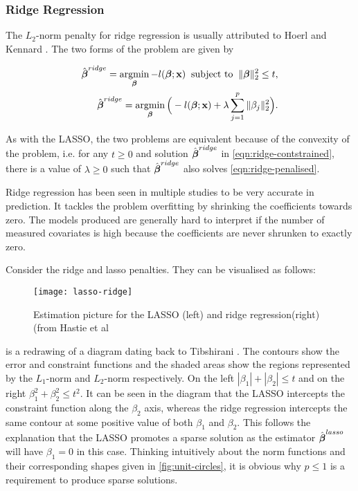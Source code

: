 \subsubsection{Ridge Regression}\label{sec:ridge-regression}

The $L_2$-norm penalty for ridge regression is usually attributed to Hoerl and Kennard . The two forms of the problem are given by

\begin{align}
    \hat{\boldsymbol{\beta}}^{ridge} =\operatorname*{argmin}_{\boldsymbol{\beta}} -l(\boldsymbol{\beta};\textbf{x})\;\;\textrm{subject to}\;\;\Vert\boldsymbol{\beta}\Vert_2^2\leq t,\label{eqn:ridge-contstrained}\\
    \hat{\boldsymbol{\beta}}^{ridge} = \operatorname*{argmin}_{\boldsymbol{\beta}}\Big(-l(\boldsymbol{\beta};\textbf{x})+\lambda\sum_{j=1}^p\Vert\beta_j\Vert_2^2\Big)\label{eqn:ridge-penalised}.
\end{align}

As with the LASSO, the two problems are equivalent because of the convexity of the problem, i.e. for any $t\geq 0$ and solution $\hat{\boldsymbol{\beta}}^{ridge}$ in \cref{eqn:ridge-contstrained}, there is a value of $\lambda\geq0$ such that $\hat{\boldsymbol{\beta}}^{ridge}$ also solves \cref{eqn:ridge-penalised}.

Ridge regression has been seen in multiple studies to be very accurate in prediction. It tackles the problem overfitting by shrinking the coefficients towards zero. The models produced are generally hard to interpret if the number of measured covariates is high because the coefficients are never shrunken to exactly zero.

Consider the ridge and lasso penalties. They can be visualised as follows:

\begin{figure}[ht!]
  \texttt{[image: lasso-ridge]}
  \caption{Estimation picture for the LASSO (left) and ridge regression(right) (from Hastie et al }
  \label{fig:lasso-ridge}
\end{figure}

 is a redrawing of a diagram dating back to Tibshirani . The contours show the error and constraint functions and the shaded areas show the regions represented by the $L_1$-norm and $L_2$-norm respectively. On the left $|\beta_1|+|\beta_2|\leq t$ and on the right $\beta_1^2+\beta_2^2\leq t^2$. It can be seen in the diagram that the LASSO intercepts the constraint function along the $\beta_2$ axis, whereas the ridge regression intercepts the same contour at some positive value of both $\beta_1$ and $\beta_2$. This follows the explanation that the LASSO promotes a sparse solution as the estimator $\hat{\boldsymbol{\beta}}^{lasso}$ will have $\beta_1=0$ in this case. Thinking intuitively about the norm functions and their corresponding shapes given in \cref{fig:unit-circles}, it is obvious why $p\leq 1$ is a requirement to produce sparse solutions.

